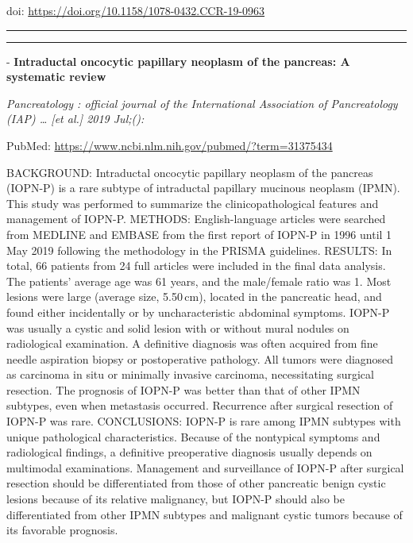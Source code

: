 \documentclass[]{article}
\begin{document}
doi: \url{https://doi.org/10.1158/1078-0432.CCR-19-0963}

{}

{}

\begin{center}\rule{0.5\linewidth}{\linethickness}\end{center}

\begin{center}\rule{0.5\linewidth}{\linethickness}\end{center}

 - \textbf{Intraductal oncocytic papillary neoplasm of the pancreas: A
systematic review}

\emph{Pancreatology : official journal of the International Association
of Pancreatology (IAP) \ldots{} {[}et al.{]} 2019 Jul;():}

PubMed: \url{https://www.ncbi.nlm.nih.gov/pubmed/?term=31375434}

BACKGROUND: Intraductal oncocytic papillary neoplasm of the pancreas
(IOPN-P) is a rare subtype of intraductal papillary mucinous neoplasm
(IPMN). This study was performed to summarize the clinicopathological
features and management of IOPN-P. METHODS: English-language articles
were searched from MEDLINE and EMBASE from the first report of IOPN-P in
1996 until 1 May 2019 following the methodology in the PRISMA
guidelines. RESULTS: In total, 66 patients from 24 full articles were
included in the final data analysis. The patients' average age was 61
years, and the male/female ratio was 1. Most lesions were large (average
size, 5.50\,cm), located in the pancreatic head, and found either
incidentally or by uncharacteristic abdominal symptoms. IOPN-P was
usually a cystic and solid lesion with or without mural nodules on
radiological examination. A definitive diagnosis was often acquired from
fine needle aspiration biopsy or postoperative pathology. All tumors
were diagnosed as carcinoma in situ or minimally invasive carcinoma,
necessitating surgical resection. The prognosis of IOPN-P was better
than that of other IPMN subtypes, even when metastasis occurred.
Recurrence after surgical resection of IOPN-P was rare. CONCLUSIONS:
IOPN-P is rare among IPMN subtypes with unique pathological
characteristics. Because of the nontypical symptoms and radiological
findings, a definitive preoperative diagnosis usually depends on
multimodal examinations. Management and surveillance of IOPN-P after
surgical resection should be differentiated from those of other
pancreatic benign cystic lesions because of its relative malignancy, but
IOPN-P should also be differentiated from other IPMN subtypes and
malignant cystic tumors because of its favorable prognosis.
\end{document}
